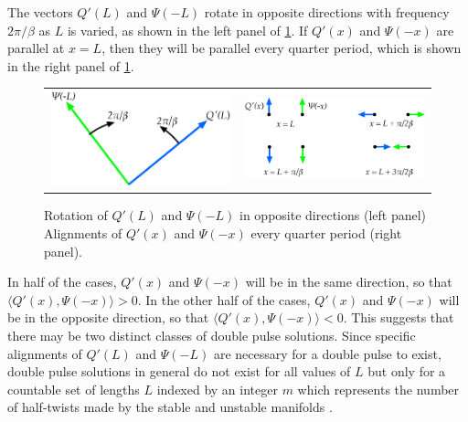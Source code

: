 \documentclass[thesis.tex]{subfiles}
\begin{document}
The vectors $Q'(L)$ and $\Psi(-L)$ rotate in opposite directions with frequency $2 \pi/\beta$ as $L$ is varied, as shown in the left panel of \cref{fig:psiqrotate}. If $Q'(x)$ and $\Psi(-x)$ are parallel at $x = L$, then they will be parallel every quarter period, which is shown in the right panel of \cref{fig:psiqrotate}.
\begin{figure}
\begin{center}
\begin{tabular}{cc}
\includegraphics[width=8cm]{images/intro/psiqrotate} &
\includegraphics[width=8cm]{images/intro/psiqoneperiod}
\end{tabular}
\caption[Alignment of vectors necessary for a double pulse]{Rotation of $Q'(L)$ and $\Psi(-L)$ in opposite directions (left panel) Alignments of $Q'(x)$ and $\Psi(-x)$ every quarter period (right panel).}
\label{fig:psiqrotate}
\end{center}
\end{figure}
In half of the cases, $Q'(x)$ and $\Psi(-x)$ will be in the same direction, so that $\langle Q'(x), \Psi(-x) \rangle > 0$. In the other half of the cases, $Q'(x)$ and $\Psi(-x)$ will be in the opposite direction, so that $\langle Q'(x), \Psi(-x) \rangle < 0$. This suggests that there may be two distinct classes of double pulse solutions. Since specific alignments of $Q'(L)$ and $\Psi(-L)$ are necessary for a double pulse to exist, double pulse solutions in general do not exist for all values of $L$ but only for a countable set of lengths $L$ indexed by an integer $m$ which represents the number of half-twists made by the stable and unstable manifolds \cite{SandstedeStrut}.  
\end{document}

